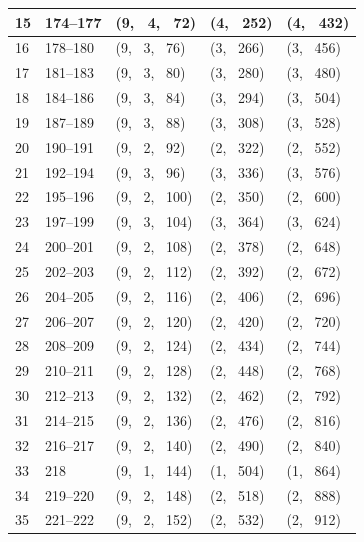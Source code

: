 \documentclass[report.tex]{subfiles}
\begin{document}
\begin{table}[ht]
\begin{tabular}{ |l|l|l|l|l| }
\hline
15 & 174--177 & (9, \ 4, \ 72) & (4, \ 252) & (4, \ 432) \\
\hline
16 & 178--180 & (9, \ 3, \ 76) & (3, \ 266) & (3, \ 456) \\
\hline
17 & 181--183 & (9, \ 3, \ 80) & (3, \ 280) & (3, \ 480) \\
\hline
18 & 184--186 & (9, \ 3, \ 84) & (3, \ 294) & (3, \ 504) \\
\hline
19 & 187--189 & (9, \ 3, \ 88) & (3, \ 308) & (3, \ 528) \\
\hline
20 & 190--191 & (9, \ 2, \ 92) & (2, \ 322) & (2, \ 552) \\
\hline
21 & 192--194 & (9, \ 3, \ 96) & (3, \ 336) & (3, \ 576) \\
\hline
22 & 195--196 & (9, \ 2, \ 100) & (2, \ 350) & (2, \ 600) \\
\hline
23 & 197--199 & (9, \ 3, \ 104) & (3, \ 364) & (3, \ 624) \\
\hline
24 & 200--201 & (9, \ 2, \ 108) & (2, \ 378) & (2, \ 648) \\
\hline
25 & 202--203 & (9, \ 2, \ 112) & (2, \ 392) & (2, \ 672) \\
\hline
26 & 204--205 & (9, \ 2, \ 116) & (2, \ 406) & (2, \ 696) \\
\hline
27 & 206--207 & (9, \ 2, \ 120) & (2, \ 420) & (2, \ 720) \\
\hline
28 & 208--209 & (9, \ 2, \ 124) & (2, \ 434) & (2, \ 744) \\
\hline
29 & 210--211 & (9, \ 2, \ 128) & (2, \ 448) & (2, \ 768) \\
\hline
30 & 212--213 & (9, \ 2, \ 132) & (2, \ 462) & (2, \ 792) \\
\hline
31 & 214--215 & (9, \ 2, \ 136) & (2, \ 476) & (2, \ 816) \\
\hline
32 & 216--217 & (9, \ 2, \ 140) & (2, \ 490) & (2, \ 840) \\
\hline
33 & 218 & (9, \ 1, \ 144) & (1, \ 504) & (1, \ 864) \\
\hline
34 & 219--220 & (9, \ 2, \ 148) & (2, \ 518) & (2, \ 888) \\
\hline
35 & 221--222 & (9, \ 2, \ 152) & (2, \ 532) & (2, \ 912) \\
\hline
\end{tabular}
\end{table}
\end{document}

